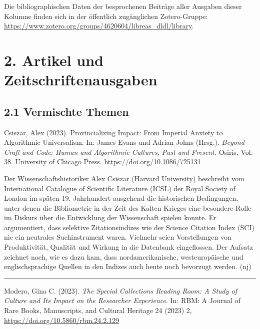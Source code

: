 \documentclass[a4paper,
fontsize=11pt,
oneside,
numbers=noperiodatend,
parskip=half-,
bibliography=totoc,
final
]{scrartcl}
\begin{document}
Die bibliographischen Daten der besprochenen Beiträge aller Ausgaben
dieser Kolumne finden sich in der öffentlich zugänglichen Zotero-Gruppe:
\url{https://www.zotero.org/groups/4620604/libreas_dldl/library}.

\hypertarget{artikel-und-zeitschriftenausgaben}{%
\section{2. Artikel und
Zeitschriftenausgaben}\label{artikel-und-zeitschriftenausgaben}}

\hypertarget{vermischte-themen}{%
\subsection{2.1 Vermischte Themen}\label{vermischte-themen}}

Csiszar, Alex (2023). Provincializing Impact: From Imperial Anxiety to
Algorithmic Universalism. In: James Evans und Adrian Johns (Hrsg.).
\emph{Beyond Craft and Code: Human and Algorithmic Cultures, Past and
Present.} Osiris, Vol. 38. University of Chicago Press.
\url{https://doi.org/10.1086/725131}

Der Wissenschaftshistoriker Alex Csiszar (Harvard University) beschreibt
vom International Catalogue of Scientific Literature (ICSL) der Royal
Society of London im späten 19. Jahrhundert ausgehend die historischen
Bedingungen, unter denen die Bibliometrie in der Zeit des Kalten Krieges
eine besondere Rolle im Diskurs über die Entwicklung der Wissenschaft
spielen konnte. Er argumentiert, dass selektive Zitationsindizes wie der
Science Citation Index (SCI) nie ein neutrales Suchinstrument waren.
Vielmehr seien Vorstellungen von Produktivität, Qualität und Wirkung in
die Datenbank eingeflossen. Der Aufsatz zeichnet nach, wie es dazu kam,
dass nordamerikanische, westeuropäische und englischsprachige Quellen in
den Indizes auch heute noch bevorzugt werden. (nj)

\begin{center}\rule{0.5\linewidth}{0.5pt}\end{center}

Modero, Gina C. (2023). \emph{The Special Collections Reading Room: A
Study of Culture and Its Impact on the Researcher Experience}. In: RBM:
A Journal of Rare Books, Manuscripts, and Cultural Heritage 24 (2023) 2,
\url{https://doi.org/10.5860/rbm.24.2.129}
\end{document}
